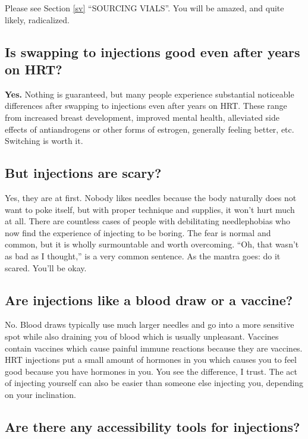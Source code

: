 \documentclass{article}
\begin{document}
Please see Section \ref{sv} “SOURCING VIALS”. You will be amazed, and quite likely, radicalized.

\subsection{Is swapping to injections good even after years on HRT?}

\textbf{Yes.} Nothing is guaranteed, but many people experience substantial noticeable differences after swapping to injections even after years on HRT. These range from increased breast development, improved mental health, alleviated side effects of antiandrogens or other forms of estrogen, generally feeling better, etc. Switching is worth it.

\subsection{But injections are scary?}

Yes, they are at first. Nobody likes needles because the body naturally does not want to poke itself, but with proper technique and supplies, it won’t hurt much at all. There are countless cases of people with debilitating needlephobias who now find the experience of injecting to be boring. The fear is normal and common, but it is wholly surmountable and worth overcoming. “Oh, that wasn’t as bad as I thought,” is a very common sentence. As the mantra goes: do it scared. You’ll be okay.

\subsection{Are injections like a blood draw or a vaccine?}

No. Blood draws typically use much larger needles and go into a more sensitive spot while also draining you of blood which is usually unpleasant. Vaccines contain vaccines which cause painful immune reactions because they are vaccines. HRT injections put a small amount of hormones in you which causes you to feel good because you have hormones in you. You see the difference, I trust. The act of injecting yourself can also be easier than someone else injecting you, depending on your inclination.

\subsection{Are there any accessibility tools for injections?}
\end{document}
